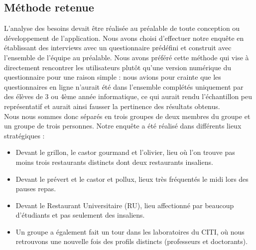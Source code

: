 \subsection{Méthode retenue}

L’analyse des besoins devait être réalisée au préalable de toute conception ou
développement de l’application. Nous avons choisi d’effectuer notre enquête en
établissant des interviews avec un questionnaire prédéfini et construit avec 
l’ensemble de l’équipe au préalable. Nous avons préféré cette méthode qui 
vise à directement rencontrer les utilisateurs plutôt qu’une version numérique
du questionnaire pour une raison simple : nous avions pour crainte que les 
questionnaires en ligne n’aurait été dans l’ensemble complétés uniquement 
par des élèves de 3 ou 4ème année informatique, ce qui aurait rendu l’échantillon
peu représentatif et aurait ainsi fausser la pertinence des résultats obtenus. \\
Nous nous sommes donc séparés en trois groupes de deux membres du groupe
et un groupe de trois personnes. Notre enquête a été réalisé dans différents 
lieux stratégiques : 
\begin{itemize}
\item Devant le grillon, le castor gourmand et l’olivier, lieu où l’on trouve pas
moins trois restaurants distincts dont deux restaurants insaliens. 
\item Devant le prévert et le castor et pollux, lieux très fréquentés le midi
lors des pauses repas.
\item Devant le Restaurant Universitaire (RU), lieu affectionné par beaucoup
d’étudiants et pas seulement des insaliens. 
\item Un groupe a également fait un tour dans les laboratoires du CITI, où
nous retrouvons une nouvelle fois des profils distincts (professeurs et 
doctorants).
\end{itemize}

